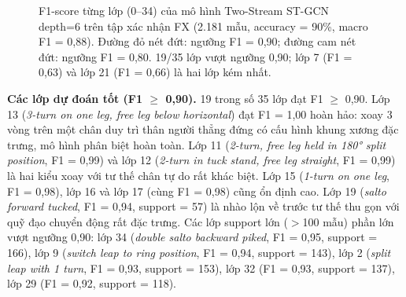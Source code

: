 \documentclass[conference]{IEEEtran}
\begin{document}
\begin{figure}[!t]
  \centering
  \caption{F1-score từng lớp (0--34) của mô hình Two-Stream ST-GCN depth=6
  trên tập xác nhận FX (2.181 mẫu, accuracy = 90\%, macro F1 = 0,88).
  Đường đỏ nét đứt: ngưỡng F1 = 0,90; đường cam nét đứt: ngưỡng F1 = 0,80.
  19/35 lớp vượt ngưỡng 0,90; lớp 7 (F1 = 0,63) và lớp 21 (F1 = 0,66)
  là hai lớp kém nhất.}
  \label{fig:f1_perclass}
\end{figure}

\textbf{Các lớp dự đoán tốt (F1 $\geq$ 0,90).}
19 trong số 35 lớp đạt F1 $\geq$ 0,90. Lớp 13
(\textit{3-turn on one leg, free leg below horizontal}) đạt F1 = 1,00 hoàn
hảo: xoay 3 vòng trên một chân duy trì thân người thẳng đứng có cấu hình
khung xương đặc trưng, mô hình phân biệt hoàn toàn. Lớp 11
(\textit{2-turn, free leg held in 180° split position}, F1 = 0,99) và lớp
12 (\textit{2-turn in tuck stand, free leg straight}, F1 = 0,99) là hai
kiểu xoay với tư thế chân tự do rất khác biệt. Lớp 15 (\textit{1-turn on
one leg}, F1 = 0,98), lớp 16 và lớp 17 (cùng F1 = 0,98) cũng ổn định
cao. Lớp 19 (\textit{salto forward tucked}, F1 = 0,94, support = 57) là
nhào lộn về trước tư thế thu gọn với quỹ đạo chuyển động rất đặc trưng.
Các lớp support lớn ($>$100 mẫu) phần lớn vượt ngưỡng 0,90: lớp 34
(\textit{double salto backward piked}, F1 = 0,95, support = 166), lớp 9
(\textit{switch leap to ring position}, F1 = 0,94, support = 143), lớp 2
(\textit{split leap with 1 turn}, F1 = 0,93, support = 153), lớp 32
(F1 = 0,93, support = 137), lớp 29 (F1 = 0,92, support = 118).
\end{document}

